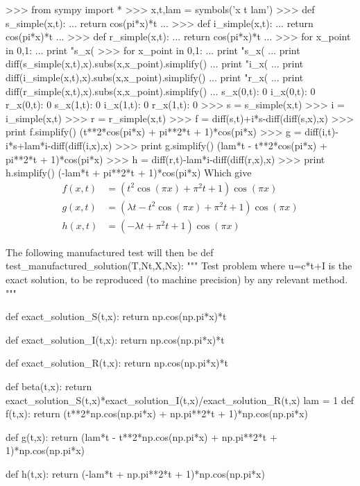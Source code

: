 \documentclass[%
twoside,                 %
final,                   %
10pt]{article}
\begin{document}
\bpycod
>>> from sympy import *
>>> x,t,lam = symbols('x t lam')
>>> def s_simple(x,t):
...     return cos(pi*x)*t
... 
>>> def i_simple(x,t):
...     return cos(pi*x)*t
... 
>>> def r_simple(x,t):
...     return cos(pi*x)*t
... 
>>> for x_point in 0,1:
...     print "s_x(%
>>> for x_point in 0,1:
...     print "s_x(%
...     print diff(s_simple(x,t),x).subs(x,x_point).simplify()
...     print "i_x(%
...     print diff(i_simple(x,t),x).subs(x,x_point).simplify()
...     print "r_x(%
...     print diff(r_simple(x,t),x).subs(x,x_point).simplify()
... 
s_x(0,t):  0
i_x(0,t):  0
r_x(0,t):  0
s_x(1,t):  0
i_x(1,t):  0
r_x(1,t):  0
>>> s = s_simple(x,t)
>>> i = i_simple(x,t)
>>> r = r_simple(x,t)
>>> f = diff(s,t)+i*s-diff(diff(s,x),x)
>>> print f.simplify()
(t**2*cos(pi*x) + pi**2*t + 1)*cos(pi*x)
>>> g = diff(i,t)-i*s+lam*i-diff(diff(i,x),x)
>>> print g.simplify()
(lam*t - t**2*cos(pi*x) + pi**2*t + 1)*cos(pi*x)
>>> h = diff(r,t)-lam*i-diff(diff(r,x),x)
>>> print h.simplify()
(-lam*t + pi**2*t + 1)*cos(pi*x)
\epycod
Which give
\begin{equation}
	\begin{aligned}
	f(x,t) &= (t^2\cos(\pi x) + \pi^2t + 1)\cos(\pi x)\\
	g(x,t) &= (\lambda t - t^2\cos(\pi x) + \pi^2t + 1)\cos(\pi x)\\
	h(x,t) &= (-\lambda t + \pi^2t + 1)\cos(\pi x)
	\end{aligned}
\end{equation}

The following manufactured test will then be
\bpycod
def test_manufactured_solution(T,Nt,X,Nx):
    """
    Test problem where u=c*t+I is the exact solution, to be
    reproduced (to machine precision) by any relevant method.
    """
    
    def exact_solution_S(t,x):
        return np.cos(np.pi*x)*t

    def exact_solution_I(t,x):
        return np.cos(np.pi*x)*t

    def exact_solution_R(t,x):
        return np.cos(np.pi*x)*t


    def beta(t,x):
        return exact_solution_S(t,x)*exact_solution_I(t,x)/exact_solution_R(t,x)
    lam = 1
    def f(t,x):
        return (t**2*np.cos(np.pi*x) + np.pi**2*t + 1)*np.cos(np.pi*x) 

    def g(t,x):
        return (lam*t - t**2*np.cos(np.pi*x) + np.pi**2*t + 1)*np.cos(np.pi*x)

    def h(t,x):
        return (-lam*t + np.pi**2*t + 1)*np.cos(np.pi*x)
        
\end{document}
